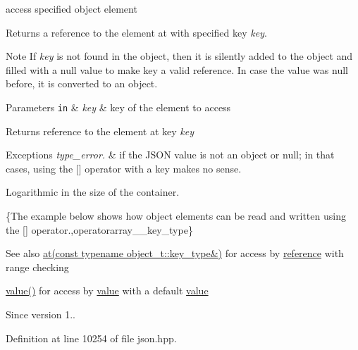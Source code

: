 access specified object element 

Returns a reference to the element at with specified key {\itshape key}.

\begin{DoxyNote}{Note}
If {\itshape key} is not found in the object, then it is silently added to the object and filled with a {\ttfamily null} value to make {\ttfamily key} a valid reference. In case the value was {\ttfamily null} before, it is converted to an object.
\end{DoxyNote}

\begin{DoxyParams}[1]{Parameters}
\mbox{\tt in}  & {\em key} & key of the element to access\\
\hline
\end{DoxyParams}
\begin{DoxyReturn}{Returns}
reference to the element at key {\itshape key} 
\end{DoxyReturn}

\begin{DoxyExceptions}{Exceptions}
{\em type\+\_\+error.} & if the J\+S\+ON value is not an object or null; in that cases, using the \mbox{[}\mbox{]} operator with a key makes no sense.\\
\hline
\end{DoxyExceptions}
Logarithmic in the size of the container.

\{The example below shows how object elements can be read and written using the {\ttfamily \mbox{[}\mbox{]}} operator.,operatorarray\+\_\+\+\_\+key\+\_\+type\}

\begin{DoxySeeAlso}{See also}
\hyperlink{classnlohmann_1_1basic__json_a93403e803947b86f4da2d1fb3345cf2c}{at(const typename object\+\_\+t\+::key\+\_\+type\&)} for access by \hyperlink{classnlohmann_1_1basic__json_ac6a5eddd156c776ac75ff54cfe54a5bc}{reference} with range checking 

\hyperlink{classnlohmann_1_1basic__json_a9fa223b26419f018f9b18cc516e3a8e5}{value()} for access by \hyperlink{classnlohmann_1_1basic__json_a9fa223b26419f018f9b18cc516e3a8e5}{value} with a default \hyperlink{classnlohmann_1_1basic__json_a9fa223b26419f018f9b18cc516e3a8e5}{value}
\end{DoxySeeAlso}
\begin{DoxySince}{Since}
version 1.. 
\end{DoxySince}


Definition at line 10254 of file json.\+hpp.

